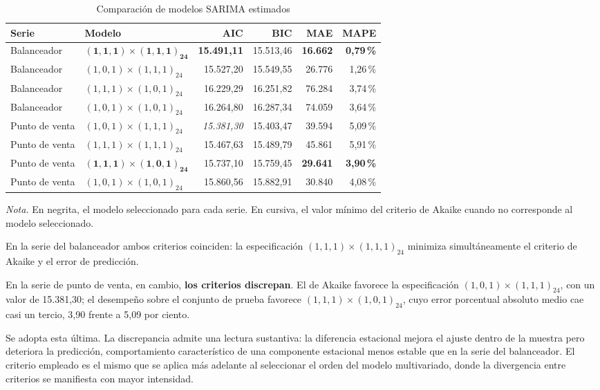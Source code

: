 \begin{table}[htbp]
\centering
\caption{Comparación de modelos SARIMA estimados}
\label{tab:sarima}
\small
\begin{tabular}{llrrrr}
\toprule
\textbf{Serie} & \textbf{Modelo} & \textbf{AIC} & \textbf{BIC} & \textbf{MAE} & \textbf{MAPE} \\
\midrule
Balanceador & $\mathbf{(1,1,1)\times(1,1,1)_{24}}$ & \textbf{15.491,11} & 15.513,46 & \textbf{16.662} & \textbf{0,79\,\%} \\
Balanceador & $(1,0,1)\times(1,1,1)_{24}$ & 15.527,20 & 15.549,55 & 26.776 & 1,26\,\% \\
Balanceador & $(1,1,1)\times(1,0,1)_{24}$ & 16.229,29 & 16.251,82 & 76.284 & 3,74\,\% \\
Balanceador & $(1,0,1)\times(1,0,1)_{24}$ & 16.264,80 & 16.287,34 & 74.059 & 3,64\,\% \\
\addlinespace
Punto de venta & $(1,0,1)\times(1,1,1)_{24}$ & \textit{15.381,30} & 15.403,47 & 39.594 & 5,09\,\% \\
Punto de venta & $(1,1,1)\times(1,1,1)_{24}$ & 15.467,63 & 15.489,79 & 45.861 & 5,91\,\% \\
Punto de venta & $\mathbf{(1,1,1)\times(1,0,1)_{24}}$ & 15.737,10 & 15.759,45 & \textbf{29.641} & \textbf{3,90\,\%} \\
Punto de venta & $(1,0,1)\times(1,0,1)_{24}$ & 15.860,56 & 15.882,91 & 30.840 & 4,08\,\% \\
\bottomrule
\end{tabular}


\vspace{0.4em}
{\footnotesize\textit{Nota.} En negrita, el modelo seleccionado para cada serie. En cursiva, el
valor mínimo del criterio de Akaike cuando no corresponde al modelo seleccionado.\par}
\end{table}

En la serie del balanceador ambos criterios coinciden: la especificación
$(1,1,1)\times(1,1,1)_{24}$ minimiza simultáneamente el criterio de Akaike y el error de
predicción.

En la serie de punto de venta, en cambio, \textbf{los criterios discrepan}. El de Akaike favorece la
especificación $(1,0,1)\times(1,1,1)_{24}$, con un valor de 15.381,30; el desempeño sobre el
conjunto de prueba favorece $(1,1,1)\times(1,0,1)_{24}$, cuyo error porcentual absoluto medio cae casi un tercio, 3,90 frente a 5,09 por ciento.

Se adopta esta última. La discrepancia admite una lectura sustantiva: la diferencia estacional
mejora el ajuste dentro de la muestra pero deteriora la predicción, comportamiento característico
de una componente estacional menos estable que en la serie del balanceador. El criterio empleado
es el mismo que se aplica más adelante al seleccionar el orden del modelo multivariado, donde la
divergencia entre criterios se manifiesta con mayor intensidad.

